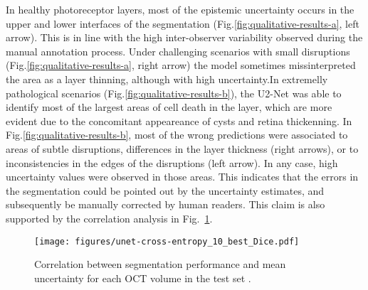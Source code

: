 In healthy photoreceptor layers, most of the epistemic uncertainty occurs in the upper and lower interfaces of the segmentation (Fig.\ref{fig:qualitative-results-a}, left arrow). This is in line with the high inter-observer variability observed during the manual annotation process. Under challenging scenarios with small disruptions (Fig.\ref{fig:qualitative-results-a}, right arrow) the model sometimes missinterpreted the area as a layer thinning, although with high uncertainty.In extremelly pathological scenarios (Fig.\ref{fig:qualitative-results-b}), the U2-Net was able to identify most of the largest areas of cell death in the layer, which are more evident due to the concomitant appeareance of cysts and retina thickenning. In Fig.\ref{fig:qualitative-results-b}, most of the wrong predictions were associated to areas of subtle disruptions, differences in the layer thickness (right arrows), or to inconsistencies in the edges of the disruptions (left arrow). In any case, high uncertainty values were observed in those areas. This indicates that the errors in the segmentation could be pointed out by the uncertainty estimates, and subsequently be manually corrected by human readers. This claim is also supported by the correlation analysis in Fig.~\ref{fig:uncertainty-volume}.

\begin{figure}[t]
 \centering
 \texttt{[image: figures/unet-cross-entropy\_10\_best\_Dice.pdf]}
 \caption{Correlation between segmentation performance and mean uncertainty for each OCT volume in the test set .}
 \label{fig:uncertainty-volume}
\end{figure}
